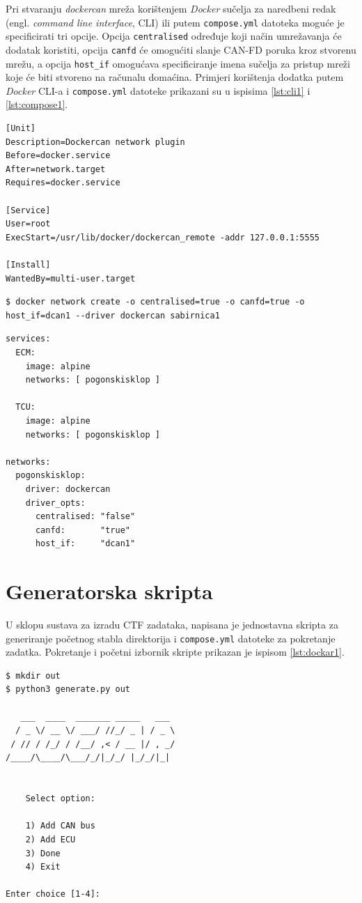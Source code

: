 \documentclass[times, utf8, diplomski, numeric]{fer}
\begin{document}
Pri stvaranju \textit{dockercan} mreža korištenjem \textit{Docker} sučelja za naredbeni redak (engl. \textit{command line interface}, CLI) ili putem \texttt{compose.yml} datoteka moguće je specificirati tri opcije. Opcija \texttt{centralised} određuje koji način umrežavanja će dodatak koristiti, opcija \texttt{canfd} će omogućiti slanje CAN-FD poruka kroz stvorenu mrežu, a opcija \texttt{host\_if} omogućava specificiranje imena sučelja za pristup mreži koje će biti stvoreno na računalu domaćina. Primjeri korištenja dodatka putem \textit{Docker} CLI-a i \texttt{compose.yml} datoteke prikazani su u ispisima \ref{lst:cli1} i \ref{lst:compose1}.


\newpage
\begin{lstlisting}[style=terminal, label={lst:systemd},caption={Konfiguracijska datoteka Systemd servisa}]
[Unit]
Description=Dockercan network plugin
Before=docker.service
After=network.target
Requires=docker.service

[Service]
User=root
ExecStart=/usr/lib/docker/dockercan_remote -addr 127.0.0.1:5555

[Install]
WantedBy=multi-user.target

\end{lstlisting}
\begin{lstlisting}[style=terminal, label={lst:cli1},caption={Korištenje dodatka kroz \textit{Docker} CLI}]
$ docker network create -o centralised=true -o canfd=true -o host_if=dcan1 --driver dockercan sabirnica1
\end{lstlisting}

\begin{lstlisting}[style=terminal, label={lst:compose1},caption={Primjer \texttt{compose.yml} datoteke}]
services:
  ECM:
    image: alpine
    networks: [ pogonskisklop ]
  
  TCU:
    image: alpine
    networks: [ pogonskisklop ]

networks:
  pogonskisklop:
    driver: dockercan
    driver_opts:
      centralised: "false"
      canfd:       "true"
      host_if:     "dcan1"
\end{lstlisting}
\newpage
\section{Generatorska skripta}
U sklopu sustava za izradu CTF zadataka, napisana je jednostavna skripta za generiranje početnog stabla direktorija i \texttt{compose.yml} datoteke za pokretanje zadatka. Pokretanje i početni izbornik skripte prikazan je ispisom \ref{lst:dockar1}.  
\begin{lstlisting}[style=terminal, label={lst:dockar1},caption={Glavni izbornik generatorske skripte}]
$ mkdir out
$ python3 generate.py out

   ___  ____  _______ _____   ___ 
  / _ \/ __ \/ ___/ //_/ _ | / _ \
 / // / /_/ / /__/ ,< / __ |/ , _/
/____/\____/\___/_/|_/_/ |_/_/|_|     
    

    Select option:

    1) Add CAN bus
    2) Add ECU
    3) Done
    4) Exit
    
Enter choice [1-4]:
\end{lstlisting}
\end{document}
